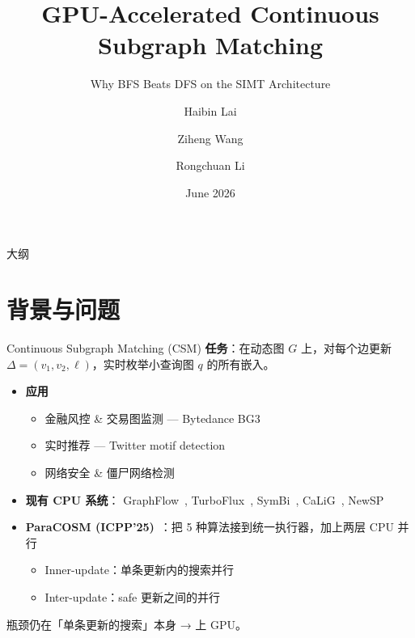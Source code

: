 \documentclass[aspectratio=169,10pt]{beamer}
\title{GPU-Accelerated Continuous Subgraph Matching}
\subtitle{Why BFS Beats DFS on the SIMT Architecture}
\author{Haibin Lai \and Ziheng Wang \and Rongchuan Li}
\institute{SUSTech HPC Lab}
\date{June 2026}
\begin{document}
\maketitle

\begin{frame}{大纲}
\tableofcontents
\end{frame}

\section{背景与问题}
\begin{frame}{Continuous Subgraph Matching (CSM)}
  \textbf{任务}：在动态图 $G$ 上，对每个边更新 $\Delta=(v_1,v_2,\ell)$，实时枚举小查询图 $q$ 的所有嵌入。
  \begin{itemize}
    \item \textbf{应用}
    \begin{itemize}
      \item 金融风控 \& 交易图监测 — Bytedance BG3~\cite{zhang2024bg3}
      \item 实时推荐 — Twitter motif detection~\cite{gupta2014twitter}
      \item 网络安全 \& 僵尸网络检测~\cite{lagraa2024network}
    \end{itemize}
    \item \textbf{现有 CPU 系统}：
    GraphFlow~\cite{graphflow},
    TurboFlux~\cite{turboflux},
    SymBi~\cite{rapids-symbi},
    CaLiG~\cite{calig},
    NewSP~\cite{newsp}
    \item \textbf{ParaCOSM (ICPP'25)}~\cite{paracosm2025}：把 5 种算法接到统一执行器，加上两层 CPU 并行
    \begin{itemize}
      \item Inner-update：单条更新内的搜索并行
      \item Inter-update：safe 更新之间的并行
    \end{itemize}
  \end{itemize}
  \vfill
  \alert{瓶颈仍在「单条更新的搜索」本身 → 上 GPU。}
\end{frame}
\end{document}
